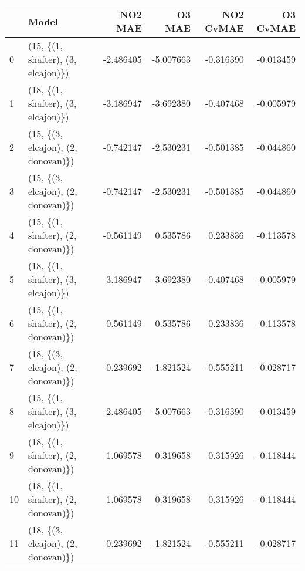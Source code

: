 \begin{tabular}{llrrrr}
\toprule
{} &                               Model &   NO2 MAE &    O3 MAE &  NO2 CvMAE &  O3 CvMAE \\
\midrule
0  &  (15, \{(1, shafter), (3, elcajon)\}) & -2.486405 & -5.007663 &  -0.316390 & -0.013459 \\
1  &  (18, \{(1, shafter), (3, elcajon)\}) & -3.186947 & -3.692380 &  -0.407468 & -0.005979 \\
2  &  (15, \{(3, elcajon), (2, donovan)\}) & -0.742147 & -2.530231 &  -0.501385 & -0.044860 \\
3  &  (15, \{(3, elcajon), (2, donovan)\}) & -0.742147 & -2.530231 &  -0.501385 & -0.044860 \\
4  &  (15, \{(1, shafter), (2, donovan)\}) & -0.561149 &  0.535786 &   0.233836 & -0.113578 \\
5  &  (18, \{(1, shafter), (3, elcajon)\}) & -3.186947 & -3.692380 &  -0.407468 & -0.005979 \\
6  &  (15, \{(1, shafter), (2, donovan)\}) & -0.561149 &  0.535786 &   0.233836 & -0.113578 \\
7  &  (18, \{(3, elcajon), (2, donovan)\}) & -0.239692 & -1.821524 &  -0.555211 & -0.028717 \\
8  &  (15, \{(1, shafter), (3, elcajon)\}) & -2.486405 & -5.007663 &  -0.316390 & -0.013459 \\
9  &  (18, \{(1, shafter), (2, donovan)\}) &  1.069578 &  0.319658 &   0.315926 & -0.118444 \\
10 &  (18, \{(1, shafter), (2, donovan)\}) &  1.069578 &  0.319658 &   0.315926 & -0.118444 \\
11 &  (18, \{(3, elcajon), (2, donovan)\}) & -0.239692 & -1.821524 &  -0.555211 & -0.028717 \\
\bottomrule
\end{tabular}
